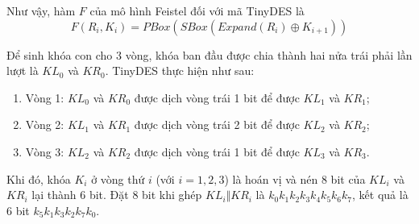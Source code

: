 Như vậy, hàm $F$ của mô hình Feistel đối với mã TinyDES là
\[F(R_i, K_i) = PBox(SBox(Expand(R_i) \oplus K_{i+1}))\]

Để sinh khóa con cho 3 vòng, khóa ban đầu được chia
thành hai nửa trái phải lần lượt là $KL_0$ và $KR_0$. 
TinyDES thực hiện như sau:

\begin{enumerate}
    \item Vòng 1: $KL_0$ và $KR_0$ được dịch vòng trái 1 bit để được $KL_1$ và $KR_1$;
    \item Vòng 2: $KL_1$ và $KR_1$ được dịch vòng trái 2 bit để được $KL_2$ và $KR_2$;
    \item Vòng 3: $KL_2$ và $KR_2$ được dịch vòng trái 1 bit để được $KL_3$ và $KR_3$.
\end{enumerate}

Khi đó, khóa $K_i$ ở vòng thứ $i$ (với $i = 1, 2, 3$) là hoán vị và nén 8 bit
của $KL_i$ và $KR_i$ lại thành 6 bit. Đặt 8 bit khi ghép $KL_i \Vert KR_i$ là 
$k_0 k_1 k_2 k_3 k_4 k_5 k_6 k_7$, kết quả là 6 bit $k_5 k_1 k_3 k_2 k_7 k_0$.